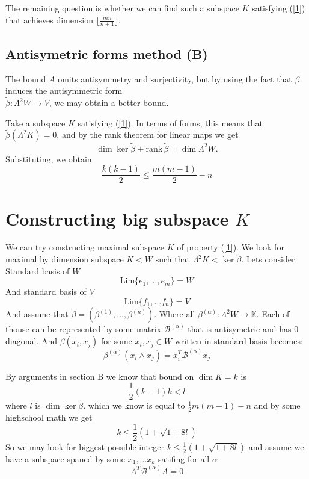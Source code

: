 \documentclass{article}
\begin{document}
The remaining question is whether we can find such a subspace $K$ satisfying (\ref{1}) that achieves dimension $\lfloor \frac{mn}{n+1}\rfloor$.

\subsection{Antisymetric forms method (B)}


The bound $A$ omits antisymmetry and surjectivity, but by using the fact that $\beta$ induces the antisymmetric form 
\\$\tilde{\beta} : \Lambda^2 W \to V$, we may obtain a better bound.

Take a subspace $K$ satisfying (\ref{1}). In terms of forms, this means that $\tilde{\beta}(\Lambda^2 K) = 0$, and by the rank theorem for linear maps we get
\[\dim \ker \tilde{\beta} + \text{rank}\,\tilde{\beta} = \dim \Lambda^2 W.\]
Substituting, we obtain
\begin{equation}
    \frac{k(k-1)}{2} \leq \frac{m(m-1)}{2} - n \label{formbound}
\end{equation}

\section{Constructing big subspace $K$}

We can try constructing maximal subspace $K$ of property (\ref{1}).
We look for maximal by dimension subspace $K < W$ such that $\Lambda^2K < \ker\tilde\beta$. Lets consider Standard basis of $W$ \[\text{Lim}\{e_1, \ldots, e_m\} = W\]
And standard basis of $V$
\[\text{Lim}\{f_1, \ldots f_n\} = V\]
And assume that $\tilde \beta = (\beta^{(1)},\ldots, \beta^{(n)})$. Where all $\beta^{(\alpha )} : \Lambda^2W \to \mathbb{K}$. Each of thouse can be represented by some matrix $\mathcal{B^{(\alpha)}}$ that is antisymetric and has $0$ diagonal. And $\beta(x_i,x_j)$ for some $x_i,x_j \in W$ written in standard basis becomes: 
\[\beta^{(\alpha)}(x_i\wedge x_j) = x_i^T\mathcal{B}^{(\alpha)}x_j\]

By arguments in section B we know that bound on $\dim K = k$ is
\[\frac{1}{2}(k-1)k < l\] where $l$ is $\dim \ker \tilde \beta$. which we know is equal to $\frac{1}{2}m(m-1) - n$ and by some highschool math we get
\[k \leq \frac{1}{2}(1+\sqrt{1+8l})\]
So we may look for biggest possible integer $k \leq \frac{1}{2}(1+\sqrt{1+8l})$ and assume we have a subspace spaned by some $x_1, \ldots x_k$ satifing for all $\alpha$
\begin{equation}
    A^T\mathcal{B}^{(\alpha)}A = 0 \label{constructionCondition}
\end{equation}
\end{document}
